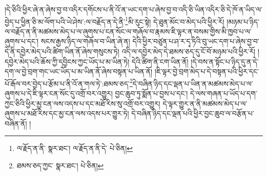 །དེ་ཅིའི་ཕྱིར་ཞེ་ན་ཞེས་བྱ་བ་འདིར་དགོངས་པ་ནི་འོ་ན་ཡང་དག་པ་ཞེས་བྱ་བ་འདི་ཅི་ཡིན་འདིར་ཅི་དེ་ཁོ་ན་ཡིད་ལ་བྱེད་པ་ཕྱིན་ཅི་མ་ལོག་པའི་ཡེ་ཤེས་:ལ་བརྗོད་ན་དེ་ནི་\footnote{ལ་རྗོད་ན་ནི་  སྣར་ཐང་། ལ་རྗོད་ན་ནི་དེ་  པེ་ཅིན། }མི་རུང་སྟེ། དེ་ཐུན་མོང་བ་མེད་པའི་ཕྱིར་རོ། །མཉམ་པ་ཉིད་ལ་བརྗོད་ན་ནི་མཚམས་མེད་པ་ལ་ཞུགས་པ་ངན་སོང་ལ་གཞོལ་བ་རྣམས་ཇི་ལྟར་ན་བསམ་གྱིས་མི་ཁྱབ་པ་ལ་ཞུགས་པ་དང་། སངས་རྒྱས་ཉིད་ལ་གཞོལ་བ་ཡིན་ཞེ་ན། དེའི་ཕྱིར་བཙུན་པ་ཤ་ར་དྭ་ཏིའི་བུ་ཡང་དག་པ་ཞེས་བྱ་བ་དེ་ནི་དབྱེར་མེད་པའི་ཚིག་ཡིན་ནོ་ཞེས་གསུངས་ཏེ། འདི་ལ་དབྱེར་མེད་དེ་ཐམས་ཅད་དུ་ངོ་བོ་མཉམ་པའི་ཕྱིར་རོ། །དབྱེར་མེད་པའི་ཆོས་ཀྱི་དབྱིངས་ཀྱང་ཡོད་པ་མ་ཡིན་ཏེ། དེའི་ཚིག་ནི་ངག་ཡིན་ནོ། །དེ་བས་ན་སྟོང་པ་ཉིད་དུ་ན་དེ་དག་ལ་བྱེ་བྲག་གང་ཡང་ཡོད་པ་མ་ཡིན་ནོ་ཞེས་བསྟན་པ་ཡིན་ནོ། །ཇི་ལྟར་བྱེ་བྲག་མེད་པ་དེ་བསྟན་པའི་ཕྱིར་དང་པོ་རྒོལ་བར་བྱེད་པ་རྩོམ་པ་ནི་འོ་ན་གལ་ཏེ་:ཐམས་ཅད་\footnote{ཐམས་ཅད་ཀྱང་  སྣར་ཐང་།  པེ་ཅིན། }དེ་བཞིན་ཉིད་དང་ལྡན་པ་ཡིན་ན་མཚམས་མེད་པ་ལ་ཞུགས་པ་དེ་ཇི་ལྟར་ངན་སོང་དུ་འགྲོ་བར་འགྱུར། བྱང་ཆུབ་ཏུ་སྨོན་པ་བྱས་པ་དང་། དེ་ལས་གཞན་པ་ཡོད་པ་དག་ཀྱང་ཅིའི་ཕྱིར་མྱ་ངན་ལས་འདས་པ་དང་མཐོ་རིས་སུ་འགྲོ་བར་འགྱུར། དེ་ལྟར་གྱུར་ན་ནི་མཚམས་མེད་པ་ལ་ཞུགས་པ་མཐོ་རིས་དང་མྱ་ངན་ལས་འདས་པར་གྱུར་ཏེ། དེ་བཞིན་ཉིད་དང་ལྡན་པའི་ཕྱིར་བྱང་ཆུབ་ལ་བརྩོན་པ་བཞིན་ནོ། །
